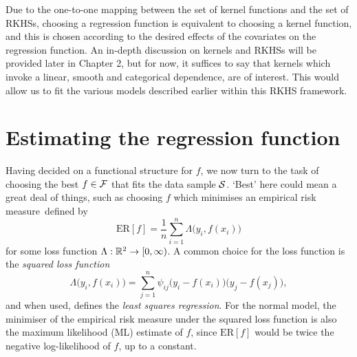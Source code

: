 \documentclass[a4paper,showframe,11pt]{report}
\begin{document}
Due to the one-to-one mapping between the set of kernel functions and the set of RKHSs, choosing a regression function is equivalent to choosing a kernel function, and this is chosen according to the desired effects of the covariates on the regression function.
An in-depth discussion on kernels and RKHSs will be provided later in Chapter 2, but for now, it suffices to say that kernels which invoke a linear, smooth and categorical dependence, are of interest.
This would allow us to fit the various models described earlier within this RKHS framework.

\section{Estimating the regression function}

Having decided on a functional structure for $f$, we now turn to the task of choosing the best $f \in {\mathcal F}$ that fits the data sample ${\mathcal S}$.
`Best' here could mean a great deal of things, such as choosing $f$ which minimises an empirical risk measure\footnotemark~defined by
%
\[
  \text{ER}[f] = \frac{1}{n} \sum_{i=1}^n \Lambda\big( y_i, f(x_i) \big)
\]
%
for some loss function $\Lambda:\mathbb{R}^2 \to [0,\infty)$.
A common choice for the loss function is the \emph{squared loss function}
%
\[
  \Lambda\big(y_i,f(x_i)\big) = \sum_{j=1}^n \psi_{ij} \big(y_i - f(x_i)\big)\big(y_j - f(x_j)\big),
\]
%
and when used, defines the \emph{least squares regression}.
For the normal model, the minimiser of the empirical risk measure under the squared loss function is also the maximum likelihood (ML) estimate of $f$, since $\text{ER}[f]$ would be twice the negative log-likelihood of $f$, up to a constant.

\end{document}
